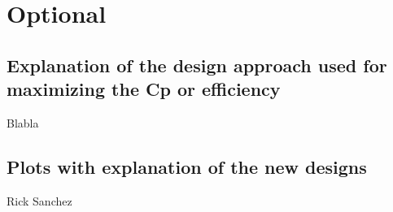\chapter{Optional}

\section{Explanation of the design approach used for maximizing the Cp or efficiency}

Blabla

\section{Plots with explanation of the new designs}

Rick Sanchez